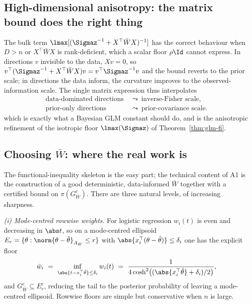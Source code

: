 \documentclass[../../main.tex]{subfiles}
\begin{document}
\subsection{High-dimensional anisotropy: the matrix bound does the right thing}
\label{subsec:a1-highdim}

The bulk term $\lmax[(\Sigmaz^{-1}+X^\top\bar W X)^{-1}]$ has the correct behaviour when $D>n$ or
$X^\top\bar W X$ is rank-deficient, which a scalar floor $\rho\Id$ cannot express. In directions
$v$ invisible to the data, $Xv=0$, so
$v^\top(\Sigmaz^{-1}+X^\top\bar W X)v=v^\top\Sigmaz^{-1}v$ and the bound reverts to the prior
scale; in directions the data inform, the curvature improves to the observed-information scale.
The single matrix expression thus interpolates
\[
  \begin{aligned}
    \text{data-dominated directions}&\ \leadsto\ \text{inverse-Fisher scale},\\
    \text{prior-only directions}&\ \leadsto\ \text{prior-covariance scale}.
  \end{aligned}
\]
which is exactly what a Bayesian GLM constant should do, and is the anisotropic refinement of the
isotropic floor $\lmax(\Sigmaz)$ of Theorem~\ref{thm:glm-fi}.

\subsection{Choosing \texorpdfstring{$\bar W$}{Wbar}: where the real work is}
\label{subsec:a1-barw}

The functional-inequality skeleton is the easy part; the technical content of A1 is the
construction of a good deterministic, data-informed $\bar W$ together with a certified bound on
$\pi(G_{\bar W}^c)$. There are three natural levels, of increasing sharpness.

\emph{(i) Mode-centred rowwise weights.} For logistic regression $w_i(t)$ is even and decreasing
in $\abs t$, so on a mode-centred ellipsoid $E_r=\{\theta:\norm{\theta-\hat\theta}_{A_{\bar
W}}\le r\}$ with $\abs{x_i^\top(\theta-\hat\theta)}\le\delta_i$ one has the explicit floor
\begin{equation}\label{eq:a1-rowwise}
  \bar w_i\ =\ \inf_{\abs{t-x_i^\top\hat\theta}\le\delta_i}w_i(t)
  \ =\ \frac{1}{4\cosh^2\!\big((\abs{x_i^\top\hat\theta}+\delta_i)/2\big)},
\end{equation}
and $G_{\bar W}^c\subseteq E_r^c$, reducing the tail to the posterior probability of leaving a
mode-centred ellipsoid. Rowwise floors are simple but conservative when $n$ is large.
\end{document}
